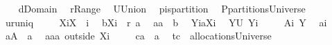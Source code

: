 \begin{isabellebody}
\ \ \isamarkupfalse%
\ {\isacharquery}d{\isacharequal}Domain\ \isamarkupfalse%
\ {\isacharquery}r{\isacharequal}Range\ \isamarkupfalse%
\ {\isacharquery}U{\isacharequal}Union\ \isamarkupfalse%
\ {\isacharquery}p{\isacharequal}is{\isacharunderscore}partition\ \isamarkupfalse%
\ {\isacharquery}P{\isacharequal}partitionsUniverse\ \isamarkupfalse%
\ {\isacharquery}u{\isacharequal}runiq\ \isanewline
\ \ \isamarkupfalse%
\ {\isacharquery}Xi{\isacharequal}{\isachardoublequoteopen}X\ {\isasymunion}\ {\isacharbraceleft}i{\isacharbraceright}{\isachardoublequoteclose}\ \isamarkupfalse%
\ {\isacharquery}b{\isacharequal}{\isachardoublequoteopen}{\isacharquery}Xi\ {\isasymtimes}\ {\isacharparenleft}{\isacharquery}r\ a{\isacharparenright}{\isachardoublequoteclose}\ \isamarkupfalse%
\ {\isacharquery}a{}{\isacharequal}{\isachardoublequoteopen}a\ {\isacharminus}\ {\isacharquery}b{\isachardoublequoteclose}\ \isamarkupfalse%
\ {\isacharquery}Yi{\isacharequal}{\isachardoublequoteopen}a{\isacharbackquote}{\isacharbackquote}{\isacharquery}Xi{\isachardoublequoteclose}\ \isamarkupfalse%
\ {\isacharquery}Y{\isacharequal}{\isachardoublequoteopen}{\isacharquery}U\ {\isacharquery}Yi{\isachardoublequoteclose}\ \isanewline
\ \ \isamarkupfalse%
\ {\isacharquery}A{}{\isacharequal}{\isachardoublequoteopen}{\isacharbraceleft}{\isacharparenleft}i{\isacharcomma}\ {\isacharquery}Y{\isacharparenright}{\isacharbraceright}{\isachardoublequoteclose}\ \isamarkupfalse%
\ {\isacharquery}a{}{\isacharequal}{\isachardoublequoteopen}{\isacharbraceleft}{\isacharparenleft}i{\isacharcomma}{\isacharbraceleft}{\isacharbraceright}{\isacharparenright}{\isacharbraceright}{\isachardoublequoteclose}\ \isamarkupfalse%
\ {\isacharquery}a{}{\isacharequal}{\isachardoublequoteopen}{\isacharquery}A{}\ {\isacharminus}\ {\isacharquery}a{}{\isachardoublequoteclose}\ \isamarkupfalse%
\ {\isacharquery}aa{}{\isacharequal}{\isachardoublequoteopen}a\ outside\ {\isacharquery}Xi{\isachardoublequoteclose}\ \isanewline
\ \ \isamarkupfalse%
\ {\isacharquery}c{\isacharequal}{\isachardoublequoteopen}{\isacharquery}a{}\ {\isasymunion}\ {\isacharquery}a{}{\isachardoublequoteclose}\ \isamarkupfalse%
\ {\isacharquery}t{}{\isacharequal}{\isachardoublequoteopen}{\isacharquery}c\ {\isasymin}\ allocationsUniverse{\isachardoublequoteclose}\ \isamarkupfalse%

\end{isabellebody}
